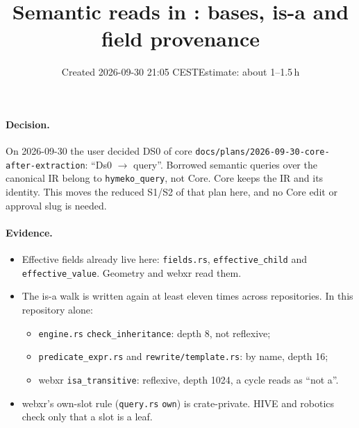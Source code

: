 \documentclass[11pt,a4paper]{article}
\title{Semantic reads in \code{hymeko\_query}: bases, is-a and field provenance}
\date{Created 2026-09-30 21:05 CEST\quad Estimate: about 1--1.5\,h}
\newcommand{\code}[1]{\texttt{#1}}
\begin{document}
\maketitle

\paragraph{Decision.} On 2026-09-30 the user decided DS0 of core
\code{docs/plans/2026-09-30-core-after-extraction}: ``Ds0 $\to$ query''. Borrowed semantic queries
over the canonical IR belong to \code{hymeko\_query}, not Core. Core keeps the IR and its
identity. This moves the reduced S1/S2 of that plan here, and no Core edit or approval slug is
needed.

\paragraph{Evidence.}
\begin{itemize}[nosep]
\item Effective fields already live here: \code{fields.rs}, \code{effective\_child} and
  \code{effective\_value}. Geometry and webxr read them.
\item The is-a walk is written again at least eleven times across repositories. In this
  repository alone:
  \begin{itemize}[nosep]
  \item \code{engine.rs} \code{check\_inheritance}: depth 8, not reflexive;
  \item \code{predicate\_expr.rs} and \code{rewrite/template.rs}: by name, depth 16;
  \item webxr \code{isa\_transitive}: reflexive, depth 1024, a cycle reads as ``not a''.
  \end{itemize}
\item webxr's own-slot rule (\code{query.rs} \code{own}) is crate-private. HIVE and robotics
  check only that a slot is a leaf.
\end{itemize}
\end{document}

